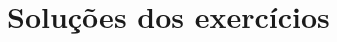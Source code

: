 \documentclass[12pt, reqno]{book}
\theoremstyle{plain}
\theoremstyle{definition}
\theoremstyle{estilo_exemplo}
\begin{document}
\appendix



\chapter{Soluções dos exercícios}

\ifdefined\updateans
{\scriptsize{}}
\else
\newenvironment{Solution}{\textbf}{}
{
\iflatexml\else\scriptsize\fi
\par
}
\fi


\cleardoublepage
{}
\iflatexml
\else
{}
\fi
\printindex
\end{document}
